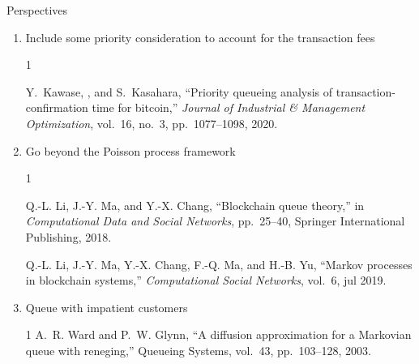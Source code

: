 \documentclass{beamer}
\begin{document}
\begin{frame}{Perspectives}
\begin{enumerate}
  \item  Include some priority consideration to account for the transaction fees 
  \tiny 
  \begin{thebibliography}{1}

Y.~Kawase, , and S.~Kasahara, ``Priority queueing analysis of
  transaction-confirmation time for bitcoin,'' {\em Journal of Industrial {\&}
  Management Optimization}, vol.~16, no.~3, pp.~1077--1098, 2020.

\end{thebibliography}

  \item \normalsize Go beyond the Poisson process framework
  \tiny
  \begin{thebibliography}{1}

Q.-L. Li, J.-Y. Ma, and Y.-X. Chang, ``Blockchain queue theory,'' in {\em
  Computational Data and Social Networks}, pp.~25--40, Springer International
  Publishing, 2018.

Q.-L. Li, J.-Y. Ma, Y.-X. Chang, F.-Q. Ma, and H.-B. Yu, ``Markov processes in
  blockchain systems,'' {\em Computational Social Networks}, vol.~6, jul 2019.

\end{thebibliography}

\item \normalsize Queue with impatient customers
  \tiny
  \begin{thebibliography}{1}
  A.~R. Ward and P.~W. Glynn, ``A diffusion approximation for a Markovian queue
  with reneging,'' Queueing Systems, vol.~43, pp.~103--128, 2003.
  \end{thebibliography}
\end{enumerate}

\end{frame}
\end{document}
